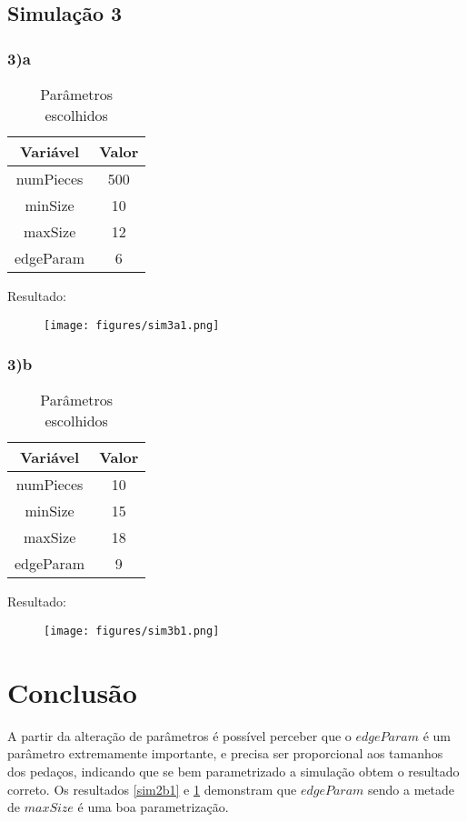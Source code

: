 \documentclass{article}
\begin{document}
\begin{multicols}{2}
\subsection{Simulação 3}

\subsubsection{3)a}
\begin{table}[H]
    \centering
    \caption{Parâmetros escolhidos}
    \begin{tabular}{| c | c |}
        \hline
        \textbf{Variável} & \textbf{Valor} \\
        \hline
        numPieces & 500 \\
        minSize & 10 \\
        maxSize & 12 \\
        edgeParam & 6 \\
        \hline
    \end{tabular}
\end{table}

Resultado: 
\begin{figure}[H]
    \centering
    \texttt{[image: figures/sim3a1.png]}
    \caption{}
    \label{sim3a1}
\end{figure}

\subsubsection{3)b}
\begin{table}[H]
    \centering
    \caption{Parâmetros escolhidos}
    \begin{tabular}{| c | c |}
        \hline
        \textbf{Variável} & \textbf{Valor} \\
        \hline
        numPieces & 10 \\
        minSize & 15 \\
        maxSize & 18 \\
        edgeParam & 9 \\
        \hline
    \end{tabular}
\end{table}

Resultado: 
\begin{figure}[H]
    \centering
    \texttt{[image: figures/sim3b1.png]}
    \caption{}
    \label{sim3b1}
\end{figure}

\section{Conclusão}
A partir da alteração de parâmetros é possível perceber que o $edgeParam$ é um parâmetro extremamente importante, e precisa ser proporcional aos tamanhos dos pedaços, indicando que se bem parametrizado a simulação obtem o resultado correto. Os resultados \ref{sim2b1} e \ref{sim3a1} demonstram que $edgeParam$ sendo a metade de $maxSize$ é uma boa parametrização.


\end{multicols}
\end{document}
